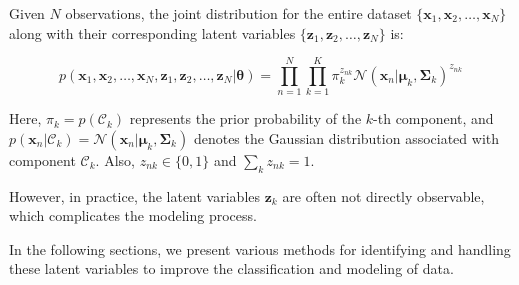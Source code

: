 Given \( N \) observations, the joint distribution for the entire dataset \( \{ \mathbf{x}_1, \mathbf{x}_2, \ldots, \mathbf{x}_N \} \) along with their corresponding latent variables \( \{ \mathbf{z}_1, \mathbf{z}_2, \ldots, \mathbf{z}_N \} \) is:

\[
p(\mathbf{x}_1, \mathbf{x}_2, \ldots, \mathbf{x}_N, \mathbf{z}_1, \mathbf{z}_2, \ldots, \mathbf{z}_N | \boldsymbol{\theta}) = \prod_{n=1}^{N} \prod_{k=1}^{K} \pi_k^{z_{nk}} \mathcal{N}(\mathbf{x}_n | \boldsymbol{\mu}_k, \boldsymbol{\Sigma}_k)^{z_{nk}}
\]

Here, \( \pi_k = p(\mathcal{C}_k) \) represents the prior probability of the \( k \)-th component, and \( p(\mathbf{x}_n | \mathcal{C}_k) = \mathcal{N}(\mathbf{x}_n | \boldsymbol{\mu}_k, \boldsymbol{\Sigma}_k) \) denotes the Gaussian distribution associated with component \( \mathcal{C}_k \). Also, \(z_{nk}\in\{0,1\}\) and \(\sum_k z_{nk}=1\).

However, in practice, the latent variables \( \mathbf{z}_k \) are often not directly observable, which complicates the modeling process.

In the following sections, we present various methods for identifying and handling these latent variables to improve the classification and modeling of data.


